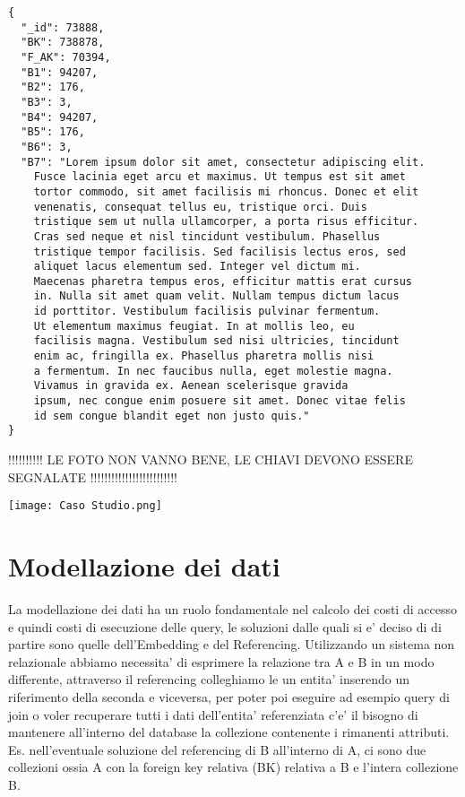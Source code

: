 \begin{Verbatim}[frame=single,framesep=2mm,label=B (COMMENTI),labelposition=all]
{
  "_id": 73888,
  "BK": 738878,
  "F_AK": 70394,
  "B1": 94207,
  "B2": 176,
  "B3": 3,
  "B4": 94207,
  "B5": 176,
  "B6": 3,
  "B7": "Lorem ipsum dolor sit amet, consectetur adipiscing elit. 
    Fusce lacinia eget arcu et maximus. Ut tempus est sit amet 
    tortor commodo, sit amet facilisis mi rhoncus. Donec et elit
    venenatis, consequat tellus eu, tristique orci. Duis 
    tristique sem ut nulla ullamcorper, a porta risus efficitur.
    Cras sed neque et nisl tincidunt vestibulum. Phasellus 
    tristique tempor facilisis. Sed facilisis lectus eros, sed 
    aliquet lacus elementum sed. Integer vel dictum mi. 
    Maecenas pharetra tempus eros, efficitur mattis erat cursus
    in. Nulla sit amet quam velit. Nullam tempus dictum lacus
    id porttitor. Vestibulum facilisis pulvinar fermentum.
    Ut elementum maximus feugiat. In at mollis leo, eu 
    facilisis magna. Vestibulum sed nisi ultricies, tincidunt
    enim ac, fringilla ex. Phasellus pharetra mollis nisi
    a fermentum. In nec faucibus nulla, eget molestie magna.
    Vivamus in gravida ex. Aenean scelerisque gravida 
    ipsum, nec congue enim posuere sit amet. Donec vitae felis
    id sem congue blandit eget non justo quis."
}
\end{Verbatim}
    !!!!!!!!!! LE FOTO NON VANNO BENE, LE CHIAVI DEVONO ESSERE SEGNALATE !!!!!!!!!!!!!!!!!!!!!!!!!
\begin{center}
    \texttt{[image: Caso Studio.png]}
\end{center}


\section{Modellazione dei dati}

La modellazione dei dati ha un ruolo fondamentale nel calcolo dei costi di accesso e quindi costi di esecuzione delle query, le soluzioni dalle quali si e' deciso di di partire 
sono quelle dell'Embedding e del Referencing. Utilizzando un sistema non relazionale abbiamo necessita' di esprimere la relazione tra A e B in un modo differente, attraverso il 
referencing colleghiamo le un entita' inserendo un riferimento della seconda e viceversa, per poter poi eseguire ad esempio query di join o voler recuperare tutti i dati 
dell'entita' referenziata c'e' il bisogno di mantenere all'interno del database la collezione contenente i rimanenti attributi. Es. nell'eventuale soluzione del referencing di B all'interno 
di A, ci sono due collezioni ossia A con la foreign key relativa (BK) relativa a B e l'intera collezione B. 

